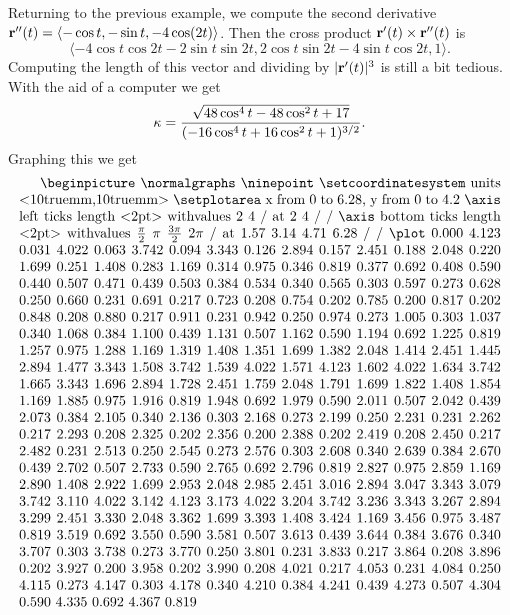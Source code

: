 \begin{example} Returning to the previous example, we compute the second derivative
${\bf r}''(t)=
\langle -\cos t,-\sin t,-4\cos(2t)\rangle$. Then the cross product 
${\bf r}'(t)\times{\bf r}''(t)$ is 
$$\langle -4\cos t\cos 2t-2\sin t\sin 2t,
2\cos t\sin 2t-4\sin t \cos2t,1\rangle.$$ Computing the length of this
vector and dividing by $|{\bf r}'(t)|^3$ is still a bit tedious.
With the aid of a computer we get
$$\kappa = {\sqrt{48\cos^4 t - 48\cos^2 t + 17}\over
(-16\cos^4 t +16\cos^2t+1)^{3/2}}.$$
Graphing this we get
$$\vbox{\beginpicture
\normalgraphs
\ninepoint
\setcoordinatesystem units <10truemm,10truemm>
\setplotarea x from 0 to 6.28, y from 0 to 4.2
\axis left ticks length <2pt> withvalues {$2$} {$4$} / at 2 4 / /
\axis bottom ticks length <2pt> withvalues {$\pi\over2$} {$\pi$} 
{$3\pi\over2$} {$2\pi$} / at 1.57 3.14 4.71 6.28 / /
\plot 
0.000 4.123 0.031 4.022 0.063 3.742 0.094 3.343 0.126 2.894 
0.157 2.451 0.188 2.048 0.220 1.699 0.251 1.408 0.283 1.169 
0.314 0.975 0.346 0.819 0.377 0.692 0.408 0.590 0.440 0.507 
0.471 0.439 0.503 0.384 0.534 0.340 0.565 0.303 0.597 0.273 
0.628 0.250 0.660 0.231 0.691 0.217 0.723 0.208 0.754 0.202 
0.785 0.200 0.817 0.202 0.848 0.208 0.880 0.217 0.911 0.231 
0.942 0.250 0.974 0.273 1.005 0.303 1.037 0.340 1.068 0.384 
1.100 0.439 1.131 0.507 1.162 0.590 1.194 0.692 1.225 0.819 
1.257 0.975 1.288 1.169 1.319 1.408 1.351 1.699 1.382 2.048 
1.414 2.451 1.445 2.894 1.477 3.343 1.508 3.742 1.539 4.022 
1.571 4.123 1.602 4.022 1.634 3.742 1.665 3.343 1.696 2.894 
1.728 2.451 1.759 2.048 1.791 1.699 1.822 1.408 1.854 1.169 
1.885 0.975 1.916 0.819 1.948 0.692 1.979 0.590 2.011 0.507 
2.042 0.439 2.073 0.384 2.105 0.340 2.136 0.303 2.168 0.273 
2.199 0.250 2.231 0.231 2.262 0.217 2.293 0.208 2.325 0.202 
2.356 0.200 2.388 0.202 2.419 0.208 2.450 0.217 2.482 0.231 
2.513 0.250 2.545 0.273 2.576 0.303 2.608 0.340 2.639 0.384 
2.670 0.439 2.702 0.507 2.733 0.590 2.765 0.692 2.796 0.819 
2.827 0.975 2.859 1.169 2.890 1.408 2.922 1.699 2.953 2.048 
2.985 2.451 3.016 2.894 3.047 3.343 3.079 3.742 3.110 4.022 
3.142 4.123 3.173 4.022 3.204 3.742 3.236 3.343 3.267 2.894 
3.299 2.451 3.330 2.048 3.362 1.699 3.393 1.408 3.424 1.169 
3.456 0.975 3.487 0.819 3.519 0.692 3.550 0.590 3.581 0.507 
3.613 0.439 3.644 0.384 3.676 0.340 3.707 0.303 3.738 0.273 
3.770 0.250 3.801 0.231 3.833 0.217 3.864 0.208 3.896 0.202 
3.927 0.200 3.958 0.202 3.990 0.208 4.021 0.217 4.053 0.231 
4.084 0.250 4.115 0.273 4.147 0.303 4.178 0.340 4.210 0.384 
4.241 0.439 4.273 0.507 4.304 0.590 4.335 0.692 4.367 0.819 
}$$
\end{example}
